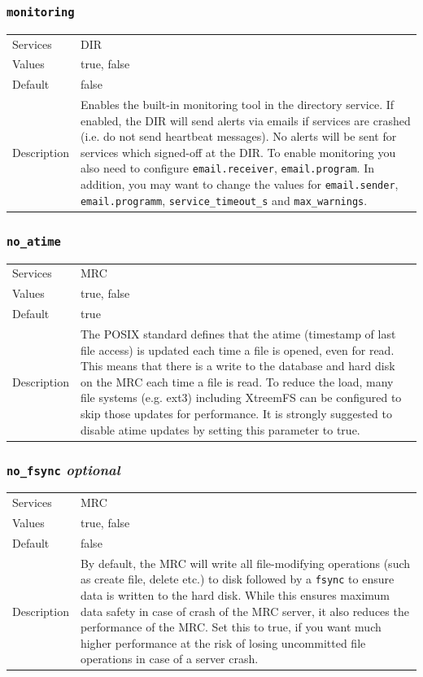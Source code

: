 \documentclass[a4paper,10pt]{book}
\begin{document}
\subsubsection{\texttt{monitoring}}
\begin{tabular}{lp{10cm}}
 Services & DIR\\
 Values   & true, false \\
 Default  & false\\
 Description & Enables the built-in monitoring tool in the directory service. If enabled, the DIR will send alerts via emails if services are crashed (i.e. do not send heartbeat messages). No alerts will be sent for services which signed-off at the DIR. To enable monitoring you also need to configure \texttt{email.receiver}, \texttt{email.program}. In addition, you may want to change the values for \texttt{email.sender}, \texttt{email.programm}, \texttt{service\_timeout\_s} and \texttt{max\_warnings}.
\end{tabular}

\subsubsection{\texttt{no\_atime}}
\begin{tabular}{lp{10cm}}
 Services & MRC\\
 Values   & true, false \\
 Default  & true\\
 Description & The POSIX standard defines that the atime (timestamp of last file access) is updated each time a file is opened, even for read. This means that there is a write to the database and hard disk on the MRC each time a file is read. To reduce the load, many file systems (e.g. ext3) including XtreemFS can be configured to skip those updates for performance. It is strongly suggested to disable atime updates by setting this parameter to true.
\end{tabular}

\subsubsection{\texttt{no\_fsync} \textit{optional}}
\begin{tabular}{lp{10cm}}
 Services & MRC\\
 Values   & true, false \\
 Default  & false\\
 Description & By default, the MRC will write all file-modifying operations (such as create file, delete etc.) to disk followed by a \texttt{fsync} to ensure data is written to the hard disk. While this ensures maximum data safety in case of crash of the MRC server, it also reduces the performance of the MRC. Set this to true, if you want much higher performance at the risk of losing uncommitted file operations in case of a server crash.
\end{tabular}
\end{document}
